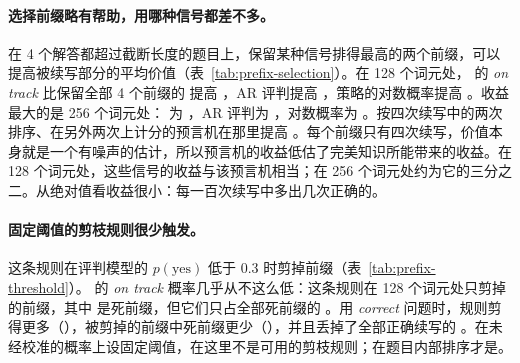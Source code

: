 \paragraph{选择前缀略有帮助，用哪种信号都差不多。} 在 4 个解答都超过截断长度的题目上，保留某种信号排得最高的两个前缀，可以提高被续写部分的平均价值（表~\ref{tab:prefix-selection}）。在 128 个词元处，\kev{} 的 \emph{on track} 比保留全部 4 个前缀的  提高  ，AR 评判提高 ，策略的对数概率提高 。收益最大的是 256 个词元处：\kev{} 为 ，AR 评判为 ，对数概率为 。按四次续写中的两次排序、在另外两次上计分的预言机在那里提高 。每个前缀只有四次续写，价值本身就是一个有噪声的估计，所以预言机的收益低估了完美知识所能带来的收益。在 128 个词元处，这些信号的收益与该预言机相当；在 256 个词元处约为它的三分之二。从绝对值看收益很小：每一百次续写中多出几次正确的。

\begin{table}[t]
\centering\small

\caption{在 4 个解答都超过截断长度的题目上，某种信号保留的 2 个前缀（共 4 个）的平均价值减去全部 4 个前缀的平均价值。95\% 区间为按题目的 bootstrap 区间。预言机按一半续写排序，在另一半上计分。}
\label{tab:prefix-selection}
\end{table}

\paragraph{固定阈值的剪枝规则很少触发。} 这条规则在评判模型的 $p(\text{yes})$ 低于 0.3 时剪掉前缀（表~\ref{tab:prefix-threshold}）。\kev{} 的 \emph{on track} 概率几乎从不这么低：这条规则在 128 个词元处只剪掉  的前缀，其中  是死前缀，但它们只占全部死前缀的 。用 \emph{correct} 问题时，规则剪得更多（），被剪掉的前缀中死前缀更少（），并且丢掉了全部正确续写的 。在未经校准的概率上设固定阈值，在这里不是可用的剪枝规则；在题目内部排序才是。

\begin{table}[t]
\centering\small

\caption{阈值规则，即 $p(\text{yes})<0.3$ 时剪枝：被剪掉的前缀比例、被剪掉的前缀中死前缀的比例，以及被剪掉的前缀本会产生的正确续写占全部正确续写的比例。}
\label{tab:prefix-threshold}
\end{table}

